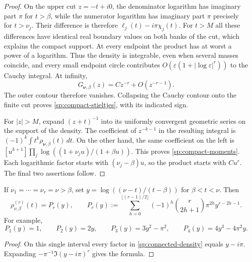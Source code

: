 \begin{proof}
On the upper cut $z=-t+i0$, the denominator logarithm has
imaginary part $\pi$ for $t>\beta$, while the numerator
logarithm has imaginary part $\pi$ precisely for $t>\nu_j$.
Their difference is therefore
$\ell_j(t)-i\pi\chi_j(t)$.
For $t>M$ all these differences have identical real boundary
values on both banks of the cut, which explains the compact
support.  At every endpoint the product has at worst a power of
a logarithm.  Thus the density is integrable, even when several
masses coincide, and every small endpoint circle contributes
$O(\varepsilon(1+|\log\varepsilon|^r))$ to the Cauchy integral.
At infinity,
\begin{equation}
 G_{\boldsymbol\nu,\beta}(z)=Cz^{-r}+O(z^{-r-1}).
 \label{sp:connected-asymptotic}
\end{equation}
The outer contour therefore vanishes.  Collapsing the Cauchy
contour onto the finite cut proves
\eqref{sp:compact-stieltjes}, with its indicated sign.

For $|z|>M$, expand $(z+t)^{-1}$ into its uniformly convergent
geometric series on the support of the density.  The coefficient
of $z^{-k-1}$ in the resulting integral is
$(-1)^k\int t^k\rho_{\boldsymbol\nu,\beta}(t)\,dt$.
On the other hand, the same coefficient on the left is
$[u^{k+1}]\prod_j\log((1+\nu_j u)/(1+\beta u))$.
This proves \eqref{sp:compact-moments}.  Each logarithmic factor
starts with $(\nu_j-\beta)u$, so the product starts with $Cu^r$.
The final two assertions follow.
\end{proof}

\begin{corollary}
\label{sp:coincident-density}
If $\nu_1=\cdots=\nu_r=\nu>\beta$, set
$y=\log((\nu-t)/(t-\beta))$ for $\beta<t<\nu$.  Then
\begin{equation}
 \rho_{\nu,\beta}^{(r)}(t)=P_r(y),\qquad
 P_r(y):=\sum_{h=0}^{\lfloor(r-1)/2\rfloor}
       (-1)^h\binom{r}{2h+1}\pi^{2h}y^{r-2h-1}.
 \label{sp:coincident-polynomial}
\end{equation}
For example,
\begin{equation}
 P_1(y)=1,\qquad P_2(y)=2y,\qquad
 P_3(y)=3y^2-\pi^2,\qquad P_4(y)=4y^3-4\pi^2y.
 \label{sp:coincident-examples}
\end{equation}
\end{corollary}

\begin{proof}
On this single interval every factor in
\eqref{sp:connected-density} equals $y-i\pi$.
Expanding $-\pi^{-1}\Im(y-i\pi)^r$ gives the formula.
\end{proof}


